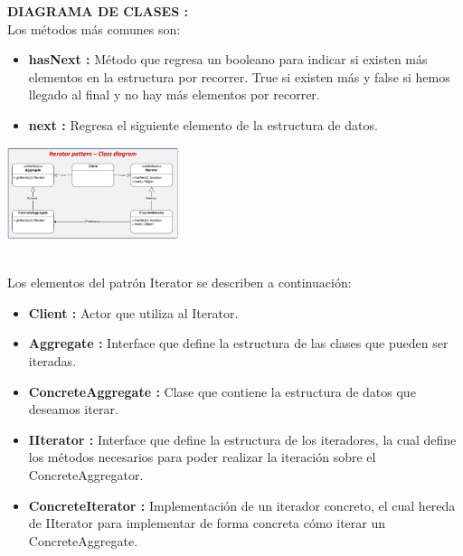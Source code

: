 \documentclass[twoside,twocolumn]{article}
\begin{document}
	\item \textbf{DIAGRAMA DE CLASES :}	\\
    Los métodos más comunes son:

    \begin{itemize}
        \item \textbf{hasNext  :} Método que regresa un booleano para indicar si existen más elementos en la estructura por recorrer. True si existen más y false si hemos llegado al final y no hay más elementos por recorrer.
        \item \textbf{next  :} Regresa el siguiente elemento de la estructura de datos.
        \end{itemize} 

        \begin{center}
            \includegraphics[width=5cm]{./img/Imagen10.png} 
        \end{center}
        \\
        Los elementos del patrón Iterator se describen a continuación:

        \begin{itemize}
            \item \textbf{Client  :} Actor que utiliza al Iterator.
            \item \textbf{Aggregate  :} Interface que define la estructura de las clases que pueden ser iteradas.
            \item \textbf{ConcreteAggregate  :} Clase que contiene la estructura de datos que deseamos iterar.
            \item \textbf{IIterator  :} Interface que define la estructura de los iteradores, la cual define los métodos necesarios para poder realizar la iteración sobre el ConcreteAggregator.
            \item \textbf{ConcreteIterator  :} Implementación de un iterador concreto, el cual hereda de IIterator para implementar de forma concreta cómo iterar un ConcreteAggregate.
            \end{itemize} 
\end{document}
